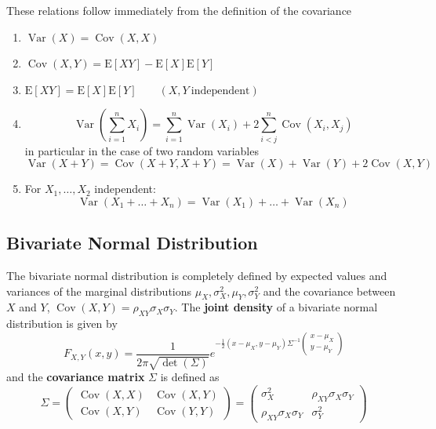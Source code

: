 \documentclass[11pt]{article}
\theoremstyle{definition}
\newcommand*\ev[1]{\mathrel{\text{E}\left[#1\right]}}
\newcommand*\Cov[1]{\mathop{\text{Cov}}\left(#1\right)}
\newcommand*\Var[1]{\mathop{\text{Var}}\left(#1\right)}
\begin{document}
\vspace{1em}
\noindent
These relations follow immediately from the definition of the covariance
\begin{enumerate}
	\item $\Var{X} = \Cov{X,X}$
	\item $\Cov{X,Y} = \ev{XY} - \ev{X}\ev{Y}$
	\item $\ev{XY} = \ev{X}\ev{Y}\qquad (X,Y\ \text{independent})$
	\item
	\begin{equation*}
		\Var{\sum_{i=1}^{n}X_i} = \sum_{i=1}^{n}\Var{X_i} + 2\sum_{i<j}^{n}\Cov{X_i,X_j}
	\end{equation*}
	in particular in the case of two random variables
	\begin{equation*}
		\Var{X + Y} = \Cov{X + Y, X + Y} = \Var{X} + \Var{Y} + 2\Cov{X,Y}
	\end{equation*}
	\item For $X_1,\dots,X_2$ independent:
	\begin{equation*}
		\Var{X_1+\dots+X_n} = \Var{X_1} + \dots + \Var{X_n}
	\end{equation*}
\end{enumerate}

\subsection{Bivariate Normal Distribution}
The bivariate normal distribution is completely defined by expected values and variances of the marginal distributions $\mu_X, \sigma_X^2, \mu_Y, \sigma_Y^2$ and the covariance between $X$ and $Y$, $\Cov{X,Y} = \rho_{XY}\sigma_X\sigma_Y$. The \textbf{joint density} of a bivariate normal distribution is given by
\begin{equation*}
	F_{X,Y}(x,y) = \frac{1}{2\pi\sqrt{\det(\Sigma)}} e^{-\frac{1}{2} (x-\mu_X, y-\mu_Y) \Sigma^{-1}\begin{pmatrix}
		x-\mu_X\\
		y-\mu_Y
		\end{pmatrix} }
\end{equation*}
and the \textbf{covariance matrix} $\Sigma$ is defined as
\begin{equation*}
	\Sigma = \begin{pmatrix}
	\Cov{X,X} & \Cov{X,Y}\\
	\Cov{X,Y} & \Cov{Y,Y}
	\end{pmatrix}
	=
	\begin{pmatrix}
		\sigma_X^2 & \rho_{XY}\sigma_X\sigma_Y\\
		\rho_{XY}\sigma_X\sigma_Y & \sigma_Y^2
	\end{pmatrix}
\end{equation*}
\end{document}
